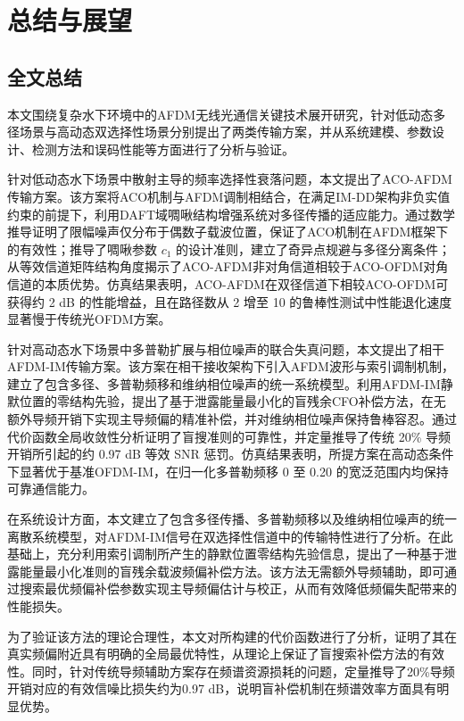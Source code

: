 \chapter{总结与展望}
\label{chap:conclusion}

\section{全文总结}
\label{sec:conclusion_summary}

本文围绕复杂水下环境中的AFDM无线光通信关键技术展开研究，针对低动态多径场景与高动态双选择性场景分别提出了两类传输方案，并从系统建模、参数设计、检测方法和误码性能等方面进行了分析与验证。

针对低动态水下场景中散射主导的频率选择性衰落问题，本文提出了ACO-AFDM传输方案。该方案将ACO机制与AFDM调制相结合，在满足IM-DD架构非负实值约束的前提下，利用DAFT域啁啾结构增强系统对多径传播的适应能力。通过数学推导证明了限幅噪声仅分布于偶数子载波位置，保证了ACO机制在AFDM框架下的有效性；推导了啁啾参数 $c_1$ 的设计准则，建立了奇异点规避与多径分离条件；从等效信道矩阵结构角度揭示了ACO-AFDM非对角信道相较于ACO-OFDM对角信道的本质优势。仿真结果表明，ACO-AFDM在双径信道下相较ACO-OFDM可获得约 2 dB 的性能增益，且在路径数从 2 增至 10 的鲁棒性测试中性能退化速度显著慢于传统光OFDM方案。

针对高动态水下场景中多普勒扩展与相位噪声的联合失真问题，本文提出了相干AFDM-IM传输方案。该方案在相干接收架构下引入AFDM波形与索引调制机制，建立了包含多径、多普勒频移和维纳相位噪声的统一系统模型。利用AFDM-IM静默位置的零结构先验，提出了基于泄露能量最小化的盲残余CFO补偿方法，在无额外导频开销下实现主导频偏的精准补偿，并对维纳相位噪声保持鲁棒容忍。通过代价函数全局收敛性分析证明了盲搜准则的可靠性，并定量推导了传统 20\% 导频开销所引起的约 0.97 dB 等效 SNR 惩罚。仿真结果表明，所提方案在高动态条件下显著优于基准OFDM-IM，在归一化多普勒频移 0 至 0.20 的宽泛范围内均保持可靠通信能力。

在系统设计方面，本文建立了包含多径传播、多普勒频移以及维纳相位噪声的统一离散系统模型，对AFDM-IM信号在双选择性信道中的传输特性进行了分析。在此基础上，充分利用索引调制所产生的静默位置零结构先验信息，提出了一种基于泄露能量最小化准则的盲残余载波频偏补偿方法。该方法无需额外导频辅助，即可通过搜索最优频偏补偿参数实现主导频偏估计与校正，从而有效降低频偏失配带来的性能损失。

为了验证该方法的理论合理性，本文对所构建的代价函数进行了分析，证明了其在真实频偏附近具有明确的全局最优特性，从理论上保证了盲搜索补偿方法的有效性。同时，针对传统导频辅助方案存在频谱资源损耗的问题，定量推导了20\%导频开销对应的有效信噪比损失约为0.97 dB，说明盲补偿机制在频谱效率方面具有明显优势。


